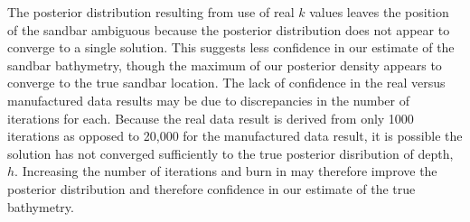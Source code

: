 The posterior distribution resulting from use of real $k$ values leaves the position of the sandbar ambiguous because the posterior distribution does not appear to converge to a single solution. This suggests less confidence in our estimate of the sandbar bathymetry, though the maximum of our posterior density appears to converge to the true sandbar location. The lack of confidence in the real versus manufactured data results may be due to discrepancies in the number of iterations for each. Because the real data result is derived from only 1000 iterations as opposed to 20,000 for the manufactured data result, it is possible the solution has not converged sufficiently to the true posterior disribution of depth, $h$. Increasing the number of iterations and burn in may therefore improve the posterior distribution and therefore confidence in our estimate of the true bathymetry. 

